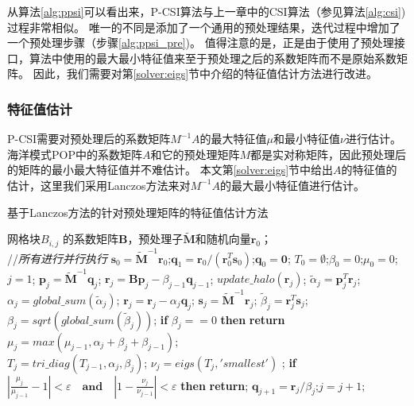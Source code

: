 从算法\ref{alg:ppsi}可以看出来，P-CSI算法与上一章中的CSI算法（参见算法\ref{alg:csi})过程非常相似。
唯一的不同是添加了一个通用的预处理结果，迭代过程中增加了一个预处理步骤（步骤\ref{alg:ppsi_pre})。 
值得注意的是，正是由于使用了预处理接口，算法中使用的最大最小特征值来至于预处理之后的系数矩阵而不是原始系数矩阵。 
因此，我们需要对第\ref{solver:eigs}节中介绍的特征值估计方法进行改进。


\subsubsection{特征值估计}
\label{precond:pcsi:eigs}
P-CSI需要对预处理后的系数矩阵$M^{-1}A$的最大特征值$\mu$和最小特征值$\nu$进行估计。 
海洋模式POP中的系数矩阵$A$和它的预处理矩阵$M$都是实对称矩阵，因此预处理后的矩阵的最小最大特征值并不难估计。 
本文第\ref{solver:eigs}节中给出$A$的特征值的估计，这里我们采用Lanczos方法\cite{Paige1980235}来对$M^{-1}A$的最大最小特征值进行估计。


\begin{algorithm}[!ht]
\caption{基于Lanczos方法的针对预处理矩阵的特征值估计方法}
\label{alg:lanczos_pre}
\begin{algorithmic}[1]
\REQUIRE 网格块$B_{i,j}$ 的系数矩阵$\textbf{B}$，预处理子$\tilde{\textbf{M}}$和随机向量$\textbf{r}_0$； \\
 //\qquad    \textit{所有进行并行执行}
\STATE $\textbf{s}_0=\tilde{\textbf{M}}^{-1}\textbf{r}_0$;\quad $\textbf{q}_1 = \textbf{r}_0/({\textbf{r}_0^T\textbf{s}_0})$;\quad $\textbf{q}_0=\textbf{0}$;
\STATE $T_0=\emptyset$;\quad $\beta_0 =0$;\quad  $\mu_0 =0$;\quad $j=1$;
\STATE $\textbf{p}_j = \tilde{\textbf{M}}^{-1}\textbf{q}_j$; \quad $\textbf{r}_j=\textbf{B}\textbf{p}_j-\beta_{j-1}\textbf{q}_{j-1}$;
\STATE $update\_halo(\textbf{r}_j)$;
\STATE $\tilde{\alpha}_j =\textbf{p}_j^T\textbf{r}_j$; \quad $\alpha_j=global\_sum(\tilde{\alpha}_j)$;
\STATE $\textbf{r}_j=\textbf{r}_j-\alpha_{j}\textbf{q}_{j}$; \quad $\textbf{s}_j = \tilde{\textbf{M}}^{-1}\textbf{r}_j$;
\STATE $\tilde{\beta}_j = \textbf{r}_j^T\textbf{s}_j$; \quad $\beta_j=sqrt(global\_sum(\tilde{\beta}_j))$;
\STATE \textbf{if} $\beta_j == 0$ \textbf{then} \textbf{return}
\STATE $\mu_j = max(\mu_{j-1},\alpha_j+\beta_j+\beta_{j-1})$; \label{lan_gersh}\\
\STATE $T_j=tri\_diag(T_{j-1},\alpha_j,\beta_j)$; \label{lan_tm}
\STATE $\nu_j = eigs(T_j,'smallest')$ ; \label{lan_nu}
\STATE \textbf{if} $|\frac{\mu_j}{\mu_{j-1}} -1 |< \varepsilon\quad\textbf{and}\quad|1- \frac{\nu_j}{\nu_{j-1}}|< \varepsilon$ \textbf{then} \textbf{return}; \label{lanczos_converge}
\STATE $\textbf{q}_{j+1}= \textbf{r}_j/\beta_j$;\quad $j=j+1$;
\ENDWHILE
\end{algorithmic}
\end{algorithm}

